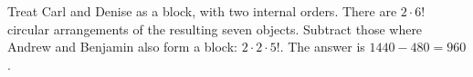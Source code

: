 Treat Carl and Denise as a block, with two internal orders. There are $2\cdot6!$ circular arrangements of the resulting seven objects. Subtract those where Andrew and Benjamin also form a block: $2\cdot2\cdot5!$. The answer is $1440-480=\boxed{960}$.
